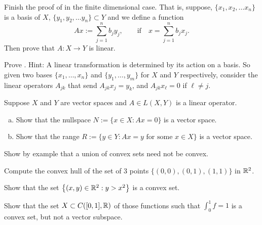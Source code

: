 \begin{exercise}
Finish the proof of  in the finite dimensional case.
That is, suppose,
$\{ x_1, x_2,\ldots x_n \}$ is a basis of $X$,
$\{ y_1, y_2,\ldots y_n \} \subset Y$ and we define a
function
\begin{equation*}
Ax := \sum_{j=1}^n b_j y_j, \qquad \text{if} \quad x=\sum_{j=1}^n b_j x_j .
\end{equation*}
Then prove that $A \colon X \to Y$ is linear.
\end{exercise}


\begin{exercise}
Prove .  Hint: A linear transformation is determined by
its action on a basis.  So given two bases
$\{ x_1,\ldots,x_n \}$ and
$\{ y_1,\ldots,y_m \}$ for $X$ and $Y$ respectively, consider the linear
operators $A_{jk}$ that send $A_{jk} x_j = y_k$, and 
$A_{jk} x_\ell = 0$ if $\ell \not= j$.
\end{exercise}

\begin{samepage}
\begin{exercise}[Easy]
Suppose $X$ and $Y$ are vector spaces and $A \in L(X,Y)$ is a linear
operator.
\begin{enumerate}[a)]
\item
Show that the nullspace $N := \{ x \in X : Ax = 0 \}$ is a
vector space.
\item
Show that the range $R := \{ y \in Y : Ax = y \text{ for some $x \in X$} \}$ is a
vector space.
\end{enumerate}
\end{exercise}
\end{samepage}

\begin{exercise}[Easy]
Show by example that a union of convex sets need not be convex.
\end{exercise}

\begin{exercise}
Compute the convex hull of the set of 3 points
$\bigl\{ (0,0), (0,1), (1,1) \bigr\}$
in ${\mathbb{R}}^2$.
\end{exercise}

\begin{exercise}
Show that the set $\bigl\{ (x,y) \in {\mathbb{R}}^2 : y > x^2 \bigr\}$ is a convex set.
\end{exercise}

\begin{exercise}
Show that the set $X \subset C([0,1],{\mathbb{R}})$ of those functions such 
that $\int_0^1 f = 1$ is a convex set, but not a vector subspace.
\end{exercise}


